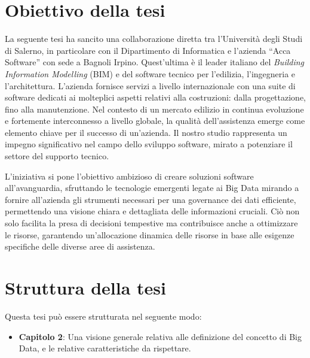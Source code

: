 \section{Obiettivo della tesi}
La seguente tesi ha sancito una collaborazione diretta tra l'Università degli Studi di Salerno, in particolare con il Dipartimento di Informatica e l'azienda ``Acca Software'' con sede a Bagnoli Irpino. Quest'ultima è il leader italiano del \textit{Building Information Modelling} (BIM) e del software tecnico per l'edilizia, l'ingegneria e l'architettura. L'azienda fornisce servizi a livello internazionale con una suite di software dedicati ai molteplici aspetti relativi alla costruzioni: dalla progettazione, fino alla manutenzione. Nel contesto di un mercato edilizio in continua evoluzione e fortemente interconnesso a livello globale, la qualità dell'assistenza emerge come elemento chiave per il successo di un'azienda. Il nostro studio rappresenta un impegno significativo nel campo dello sviluppo software, mirato a potenziare il settore del supporto tecnico.

L'iniziativa si pone l'obiettivo ambizioso di creare soluzioni software all'avanguardia, sfruttando le tecnologie emergenti legate ai Big Data mirando a fornire all'azienda gli strumenti necessari per una governance dei dati efficiente, permettendo una visione chiara e dettagliata delle informazioni cruciali. Ciò non solo facilita la presa di decisioni tempestive ma contribuisce anche a ottimizzare le risorse, garantendo un'allocazione dinamica delle risorse in base alle esigenze specifiche delle diverse aree di assistenza.

\section{Struttura della tesi}
Questa tesi può essere strutturata nel seguente modo:

\begin{itemize}
    \item \textbf{Capitolo 2}: Una visione generale relativa alle definizione del concetto di Big Data, e le relative caratteristiche da rispettare.
\end{itemize}